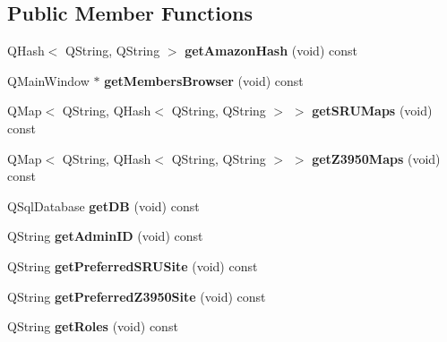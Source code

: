 \subsection*{Public Member Functions}
\begin{DoxyCompactItemize}
\item 
Q\+Hash$<$ Q\+String, Q\+String $>$ {\bfseries get\+Amazon\+Hash} (void) const \hypertarget{classbiblioteq_a3618108d9eed5862cec1ee7194cb27bf}{}\label{classbiblioteq_a3618108d9eed5862cec1ee7194cb27bf}

\item 
Q\+Main\+Window $\ast$ {\bfseries get\+Members\+Browser} (void) const \hypertarget{classbiblioteq_ab8260306aa44418a9b109fc26270f176}{}\label{classbiblioteq_ab8260306aa44418a9b109fc26270f176}

\item 
Q\+Map$<$ Q\+String, Q\+Hash$<$ Q\+String, Q\+String $>$ $>$ {\bfseries get\+S\+R\+U\+Maps} (void) const \hypertarget{classbiblioteq_ab46fd3374287959c3f13216ec5fdc179}{}\label{classbiblioteq_ab46fd3374287959c3f13216ec5fdc179}

\item 
Q\+Map$<$ Q\+String, Q\+Hash$<$ Q\+String, Q\+String $>$ $>$ {\bfseries get\+Z3950\+Maps} (void) const \hypertarget{classbiblioteq_af47999e074de54cec2af68b040042ef2}{}\label{classbiblioteq_af47999e074de54cec2af68b040042ef2}

\item 
Q\+Sql\+Database {\bfseries get\+DB} (void) const \hypertarget{classbiblioteq_af6782af753826b7239b9e379490baa70}{}\label{classbiblioteq_af6782af753826b7239b9e379490baa70}

\item 
Q\+String {\bfseries get\+Admin\+ID} (void) const \hypertarget{classbiblioteq_a64256300b17c43e1889f2ec022226b39}{}\label{classbiblioteq_a64256300b17c43e1889f2ec022226b39}

\item 
Q\+String {\bfseries get\+Preferred\+S\+R\+U\+Site} (void) const \hypertarget{classbiblioteq_a7c9e5e9dc065598804fefc5e5c6e5492}{}\label{classbiblioteq_a7c9e5e9dc065598804fefc5e5c6e5492}

\item 
Q\+String {\bfseries get\+Preferred\+Z3950\+Site} (void) const \hypertarget{classbiblioteq_a4c4625515fa8dbdb3d26a39af919c25d}{}\label{classbiblioteq_a4c4625515fa8dbdb3d26a39af919c25d}

\item 
Q\+String {\bfseries get\+Roles} (void) const \hypertarget{classbiblioteq_a65c95e919984ca1d0c6c7f74ad95310f}{}\label{classbiblioteq_a65c95e919984ca1d0c6c7f74ad95310f}


\end{DoxyCompactItemize}
